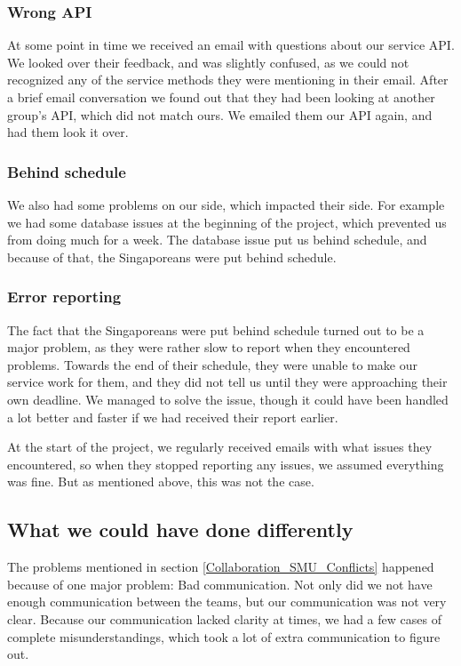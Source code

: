 \subsubsection{Wrong API}
\label{Collaboration_SMU_ConflictsAPI}
At some point in time we received an email with questions about our service API. We looked over their feedback, and was slightly confused, as we could not recognized any of the service methods they were mentioning in their email. After a brief email conversation we found out that they had been looking at another group's API, which did not match ours. We emailed them our API again, and had them look it over.

\subsubsection{Behind schedule}
\label{Cooperation_schedule}
We also had some problems on our side, which impacted their side. For example we had some database issues at the beginning of the project, which prevented us from doing much for a week. The database issue put us behind schedule, and because of that, the Singaporeans were put behind schedule.

\subsubsection{Error reporting}
\label{Cooperation_error}
The fact that the Singaporeans were put behind schedule turned out to be a major problem, as they were rather slow to report when they encountered problems. Towards the end of their schedule, they were unable to make our service work for them, and they did not tell us until they were approaching their own deadline. We managed to solve the issue, though it could have been handled a lot better and faster if we had received their report earlier.

At the start of the project, we regularly received emails with what issues they encountered, so when they stopped reporting any issues, we assumed everything was fine. But as mentioned above, this was not the case.

\subsection{What we could have done differently}
\label{Collaboration_SMU_CouldHave}
The problems mentioned in section \ref{Collaboration_SMU_Conflicts} happened because of one major problem: Bad communication. Not only did we not have enough communication between the teams, but our communication was not very clear. Because our communication lacked clarity at times, we had a few cases of complete misunderstandings, which took a lot of extra communication to figure out.

